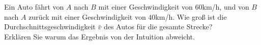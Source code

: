 \begin{ExerciseBlock}
Ein Auto fährt von $A$ nach $B$ mit einer Geschwindigkeit von $60$km/h, und von $B$ nach $A$ zurück mit einer Geschwindigkeit von $40$km/h. Wie groß ist die Durchschnittsgeschwindigkeit $\bar{v}$ des Autos für die gesamte Strecke? \\
Erklären Sie warum das Ergebnis von der Intuition abweicht.
\end{ExerciseBlock}
